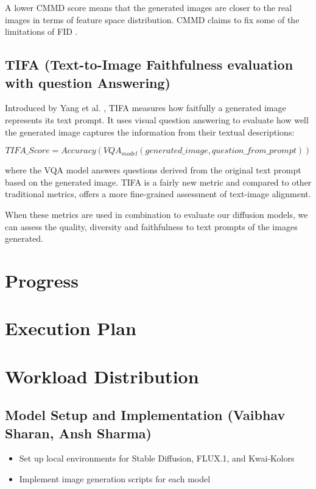 \documentclass{article}
\begin{document}
A lower CMMD score means that the generated images are closer to the real images in terms of feature space distribution. CMMD claims to 
fix some of the limitations of FID \cite{rethinkingFID2024}.

\subsection{TIFA (Text-to-Image Faithfulness evaluation with question Answering)}

Introduced by Yang et al. \cite{yang2022empirical}, TIFA measures how faitfully a generated image represents its text prompt.
It uses visual question answering to evaluate how well the generated image captures the information from their textual descriptions:

\begin{equation}
    TIFA\_Score = Accuracy(VQA_{model}(generated\_image, question\_from\_prompt))
\end{equation}

where the VQA model answers questions derived from the original text prompt based on the generated image. 
TIFA is a fairly new metric and compared to other traditional metrics, offers a more fine-grained assessment of text-image alignment.

When these metrics are used in combination to evaluate our diffusion models, we can assess the quality, diversity and faithfulness
to text prompts of the images generated.


\section{Progress}


\section{Execution Plan}



\section{Workload Distribution}

\subsection{Model Setup and Implementation (Vaibhav Sharan, Ansh Sharma)}
\begin{itemize}
    \item Set up local environments for Stable Diffusion, FLUX.1, and Kwai-Kolors
    \item Implement image generation scripts for each model
\end{itemize}
\end{document}
